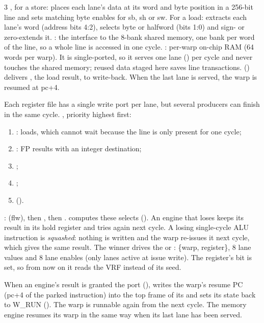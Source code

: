 \begin{multicols*}{3}
, for a store: places each  lane's data at its word and byte position in a 256-bit line and sets matching byte enables for sb, sh or sw. For a load: extracts each  lane's word (address bits 4:2), selects byte or halfword (bits 1:0) and sign- or zero-extends it.
: the  interface to the 8-bank shared memory, one bank per word of the line, so a whole line is accessed in one cycle.
: per-warp on-chip RAM (64 words per warp). It is single-ported, so it serves one lane () per cycle and never touches the shared memory; reused data staged here saves line transactions.
 () delivers , the load result, to write-back. When the last lane is served, the warp is resumed at pc+4.

Each register file has a single write port per lane, but several producers can finish in the same cycle.
, priority highest first:
\begin{enumerate}[leftmargin=4mm]
\item {}: loads, which cannot wait because the line is only present for one cycle;
\item {}: FP results with an integer destination;
\item {};
\item {};
\item {} ().
\end{enumerate}
:  (flw), then , then .
 computes these selects (). An engine that loses keeps its result in its hold register and tries again next cycle. A losing single-cycle ALU instruction is \emph{squashed}: nothing is written and the warp re-issues it next cycle, which gives the same result.
The winner drives the  or : \{warp, register\}, 8 lane values and 8 lane enables (only lanes active at issue write). The register's  bit is set, so from now on it reads the VRF instead of its seed.

When an engine's result is granted the port (),  writes the warp's resume PC (pc+4 of the parked instruction) into the top frame of its  and sets its state back to W\_RUN (). The warp is runnable again from the next cycle. The memory engine resumes its warp in the same way when its last lane has been served.


\end{multicols*}
